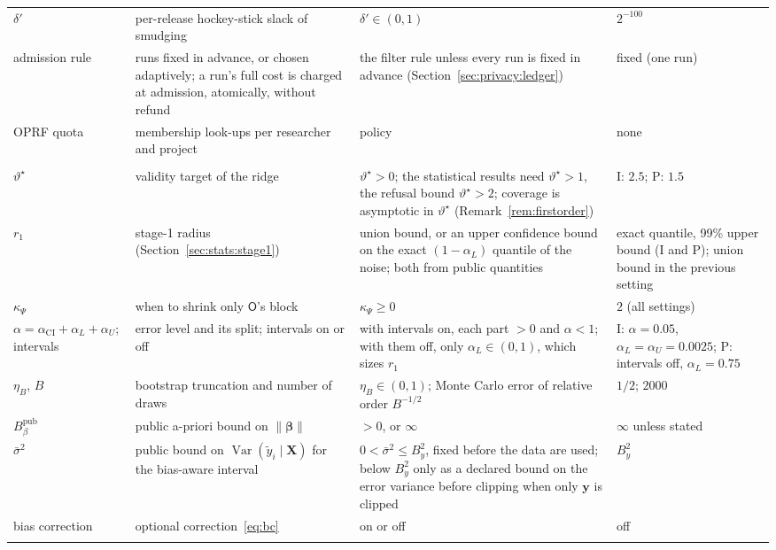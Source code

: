 \documentclass[11pt]{article}
\theoremstyle{definition}
\theoremstyle{plain}
\newcommand{\bX}{\mathbf{X}}
\newcommand{\by}{\mathbf{y}}
\newcommand{\bbeta}{\boldsymbol{\beta}}
\newcommand{\Party}[1]{\textsf{#1}}
\newcommand{\Op}{\Party{O}}
\begin{document}
{\begin{xltabular}{\textwidth}{@{}>{\raggedright\arraybackslash}p{2.35cm}>{\raggedright\arraybackslash}X>{\raggedright\arraybackslash}X>{\raggedright\arraybackslash}p{3.0cm}@{}}
$\delta'$ & per-release hockey-stick slack of smudging & $\delta' \in (0, 1)$ & $2^{-100}$ \\
admission rule & runs fixed in advance, or chosen adaptively; a run's full cost is charged at admission, atomically, without refund & the filter rule unless every run is fixed in advance (Section~\ref{sec:privacy:ledger}) & fixed (one run) \\
OPRF quota & membership look-ups per researcher and project & policy & none \\
\midrule
{} \\*
$\vartheta^\star$ & validity target of the ridge & $\vartheta^\star > 0$; the statistical results need $\vartheta^\star > 1$, the refusal bound $\vartheta^\star > 2$; coverage is asymptotic in $\vartheta^\star$ (Remark~\ref{rem:firstorder}) & I: $2.5$; P: $1.5$ \\
$r_1$ & stage-1 radius (Section~\ref{sec:stats:stage1}) & union bound, or an upper confidence bound on the exact $(1 - \alpha_L)$ quantile of the noise; both from public quantities & exact quantile, 99\% upper bound (I and P); union bound in the previous setting \\
$\kappa_\Psi$ & when to shrink only $\Op$'s block & $\kappa_\Psi \ge 0$ & $2$ (all settings) \\
$\alpha = \alpha_{\mathrm{CI}} + \alpha_L + \alpha_U$; intervals & error level and its split; intervals on or off & with intervals on, each part $> 0$ and $\alpha < 1$; with them off, only $\alpha_L \in (0, 1)$, which sizes $r_1$ & I: $\alpha = 0.05$, $\alpha_L = \alpha_U = 0.0025$; P: intervals off, $\alpha_L = 0.75$ \\
$\eta_B$, $B$ & bootstrap truncation and number of draws & $\eta_B \in (0, 1)$; Monte Carlo error of relative order $B^{-1/2}$ & $1/2$; $2000$ \\
$B_\beta^{\mathrm{pub}}$ & public a-priori bound on $\|\bbeta\|$ & $> 0$, or $\infty$ & $\infty$ unless stated \\
$\bar\sigma^2$ & public bound on $\operatorname{Var}(\tilde y_i \mid \bX)$ for the bias-aware interval & $0 < \bar\sigma^2 \le B_y^2$, fixed before the data are used; below $B_y^2$ only as a declared bound on the error variance before clipping when only $\by$ is clipped & $B_y^2$ \\
bias correction & optional correction~\eqref{eq:bc} & on or off & off \\
\midrule
{} \\*

\end{xltabular}}
\end{document}
